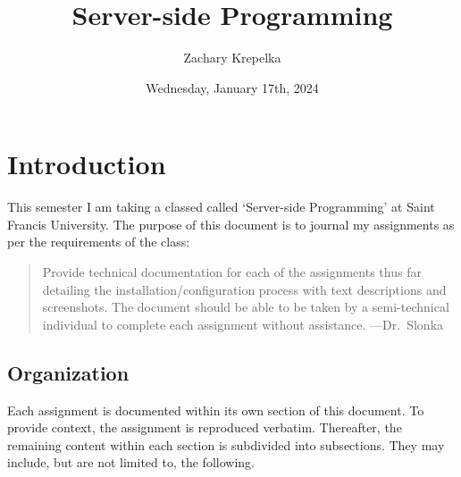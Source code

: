 \documentclass{article}
\title{Server-side Programming}
\author{Zachary Krepelka}
\date{Wednesday, January 17th, 2024}
\begin{document}
\maketitle
\tableofcontents
\newpage
\listoflistings
\listoffigures
\newpage




\section*{Introduction}

This semester I am taking a classed called `Server-side Programming' at Saint
Francis University. The purpose of this document is to journal my assignments as
per the requirements of the class:

\begin{quote}

	Provide technical documentation for each of the assignments thus far
	detailing the installation/configuration process with text descriptions
	and screenshots.  The document should be able to be taken by a
	semi-technical individual to complete each assignment without
	assistance. ---Dr.\ Slonka

\end{quote}


\subsection*{Organization}

Each assignment is documented within its own section of this document.  To
provide context, the assignment is reproduced verbatim.  Thereafter, the
remaining content within each section is subdivided into subsections.  They may
include, but are not limited to, the following.
\end{document}
